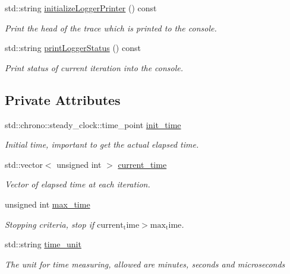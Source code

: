 \begin{DoxyCompactItemize}
std\+::string \mbox{\hyperlink{classlogger_1_1_time_logger_a60f041a21157b1049f512d325c3d35ac}{initialize\+Logger\+Printer}} () const
\begin{DoxyCompactList}\small\item\em Print the head of the trace which is printed to the console. \end{DoxyCompactList}\item 
std\+::string \mbox{\hyperlink{classlogger_1_1_time_logger_ad98f34f3584b2ac448d6a5ef69ee2af1}{print\+Logger\+Status}} () const
\begin{DoxyCompactList}\small\item\em Print status of current iteration into the console. \end{DoxyCompactList}\end{DoxyCompactItemize}
\subsection*{Private Attributes}
\begin{DoxyCompactItemize}
\item 
std\+::chrono\+::steady\+\_\+clock\+::time\+\_\+point \mbox{\hyperlink{classlogger_1_1_time_logger_ac6bc060040da5dc7b8b20bdae3b7cd2b}{init\+\_\+time}}
\begin{DoxyCompactList}\small\item\em Initial time, important to get the actual elapsed time. \end{DoxyCompactList}\item 
std\+::vector$<$ unsigned int $>$ \mbox{\hyperlink{classlogger_1_1_time_logger_a57bbc70bcc5e0fb1b1a62d49af30bf3b}{current\+\_\+time}}
\begin{DoxyCompactList}\small\item\em Vector of elapsed time at each iteration. \end{DoxyCompactList}\item 
unsigned int \mbox{\hyperlink{classlogger_1_1_time_logger_a48ea18ddd1f44f11ad52448cfde37e63}{max\+\_\+time}}
\begin{DoxyCompactList}\small\item\em Stopping criteria, stop if $\mathrm{current_time} > \mathrm{max_time}$. \end{DoxyCompactList}\item 
std\+::string \mbox{\hyperlink{classlogger_1_1_time_logger_ab5a6998dea294708d1d393b2b2f240bb}{time\+\_\+unit}}
\begin{DoxyCompactList}\small\item\em The unit for time measuring, allowed are {\ttfamily minutes}, {\ttfamily seconds} and {\ttfamily microseconds} \end{DoxyCompactList}\end{DoxyCompactItemize}
